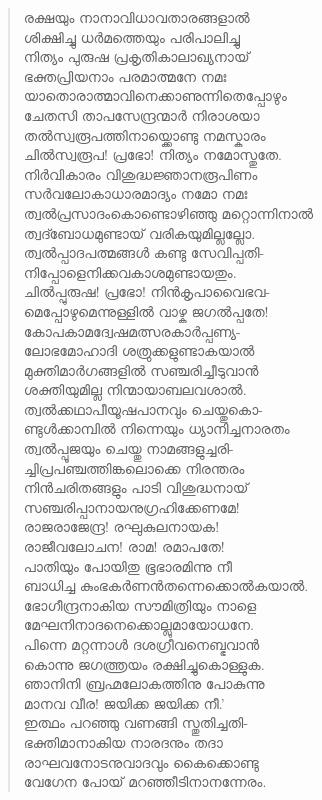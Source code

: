 \begin{verse}
രക്ഷയും നാനാവിധാവതാരങ്ങളാല്‍\\
ശിക്ഷിച്ചു ധര്‍മത്തെയും പരിപാലിച്ചു\\
നിത്യം പുരുഷ പ്രകൃതികാലാഖ്യനായ്\\
ഭക്തപ്രിയനാം പരമാത്മനേ നമഃ\\
യാതൊരാത്മാവിനെക്കാണുന്നിതെപ്പോഴും\\
ചേതസി താപസേന്ദ്രന്മാര്‍ നിരാശയാ\\
തല്‍സ്വരൂപത്തിനായ്ക്കൊണ്ടു നമസ്കാരം\\
ചില്‍സ്വരൂപ! പ്രഭോ! നിത്യം നമോസ്തുതേ.\\
നിര്‍വികാരം വിശുദ്ധജ്ഞാനരൂപിണം\\
സര്‍വലോകാധാരമാദ്യം നമോ നമഃ\\
ത്വല്‍പ്രസാദംകൊണ്ടൊഴിഞ്ഞു മറ്റൊന്നിനാല്‍\\
ത്വദ്ബോധമുണ്ടായ് വരികയുമില്ലല്ലോ.\\
ത്വല്‍പ്പാദപത്മങ്ങള്‍ കണ്ടു സേവിപ്പതി-\\
നിപ്പോളെനിക്കവകാശമുണ്ടായതും.\\
ചില്‍പ്പുരുഷ! പ്രഭോ! നിന്‍കൃപാവൈഭവ-\\
മെപ്പോഴുമെന്നുള്ളില്‍ വാഴ്ക ജഗല്‍പ്പതേ!\\
കോപകാമദ്വേഷമത്സരകാര്‍പ്പണ്യ-\\
ലോഭമോഹാദി ശത്രുക്കളുണ്ടാകയാല്‍\\
മുക്തിമാര്‍ഗങ്ങളില്‍ സഞ്ചരിച്ചീടുവാന്‍\\
ശക്തിയുമില്ല നിന്മായാബലവശാല്‍.\\
ത്വല്‍ക്കഥാപീയൂഷപാനവും ചെയ്തുകൊ-\\
ണ്ടുള്‍ക്കാമ്പില്‍ നിന്നെയും ധ്യാനിച്ചനാരതം\\
ത്വല്‍പ്പൂജയും ചെയ്തു നാമങ്ങളുച്ചരി-\\
ച്ചിപ്രപഞ്ചത്തിങ്കലൊക്കെ നിരന്തരം\\
നിന്‍ചരിതങ്ങളും പാടി വിശുദ്ധനായ്\\
സഞ്ചരിപ്പാനായനുഗ്രഹിക്കേണമേ!\\
രാജരാജേന്ദ്ര! രഘുകുലനായക!\\
രാജീവലോചന! രാമ! രമാപതേ!\\
പാതിയും പോയിതു ഭൂഭാരമിന്നു നീ\\
ബാധിച്ച കുംഭകര്‍ണന്‍തന്നെക്കൊല്‍കയാല്‍.\\
ഭോഗീന്ദ്രനാകിയ സൗമിത്രിയും നാളെ\\
മേഘനിനാദനെക്കൊല്ലുമായോധനേ.\\
പിന്നെ മറ്റന്നാള്‍ ദശഗ്രീവനെബ്ഭവാന്‍\\
കൊന്നു ജഗത്ത്രയം രക്ഷിച്ചുകൊള്ളുക.\\
ഞാനിനി ബ്രഹ്മലോകത്തിനു പോകുന്നു\\
മാനവ വീര! ജയിക്ക ജയിക്ക നീ.’\\
ഇത്ഥം പറഞ്ഞു വണങ്ങി സ്തുതിച്ചതി-\\
ഭക്തിമാനാകിയ നാരദനും തദാ\\
രാഘവനോടനുവാദവും കൈക്കൊണ്ടു\\
വേഗേന പോയ് മറഞ്ഞീടിനാനന്നേരം.
\end{verse}

